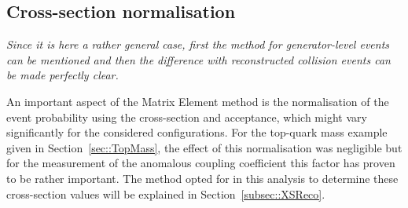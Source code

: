 \subsection{Cross-section  normalisation}
\textit{Since it is here a rather general case, first the method for generator-level events can be mentioned and then the difference with reconstructed collision events can be made perfectly clear.}

An important aspect of the Matrix Element method is the normalisation of the event probability using the cross-section and acceptance, which might vary significantly for the considered configurations. For the top-quark mass example given in Section~\ref{sec::TopMass}, the effect of this normalisation was negligible but for the measurement of the anomalous coupling coefficient this factor has proven to be rather important. The method opted for in this analysis to determine these cross-section values will be explained in Section~\ref{subsec::XSReco}.

